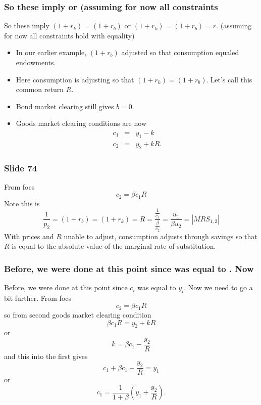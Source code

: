 \documentclass[aspectratio=169]{ltx-talk}
\begin{document}
\begin{frame}
\frametitle{So these imply or (assuming for now all constraints}
So these imply $\left( 1+r_{k}\right) =\left( 1+r_{b}\right) $ or $\left(
1+r_{k}\right) =\left( 1+r_{b}\right) =r.$ (assuming for now all constraints
hold with equality)

\begin{itemize}
\item In our earlier example, $\left( 1+r_{b}\right) $ adjusted so that
consumption equaled endowments.

\item Here consumption is adjusting so that $\left( 1+r_{k}\right) =\left(
1+r_{b}\right) .\ $Let's call this common return $R$.

\item Bond market clearing still gives $b=0.$

\item Goods market clearing conditions are now 
\begin{eqnarray*}
c_{1} &=&y_{1}-k \\
c_{2} &=&y_{2}+kR.
\end{eqnarray*}%
\end{itemize}
\end{frame}

\begin{frame}
\frametitle{Slide 74}
From focs 
\begin{equation*}
c_{2}=\beta c_{1}R
\end{equation*}%
Note this is 
\begin{equation*}
\frac{1}{p_{2}}=\left( 1+r_{b}\right) =\left( 1+r_{k}\right) =R=\frac{\frac{1%
}{c_{1}}}{\frac{\beta }{c_{2}}}=\frac{u_{1}}{\beta u_{2}}=\left\vert
MRS_{1,2}\right\vert
\end{equation*}%
With prices and $R$ unable to adjust, consumption adjusts through savings so
that $R$ is equal to the absolute value of the marginal rate of
substitution.
\end{frame}

\begin{frame}
\frametitle{Before, we were done at this point since was equal to . Now}
Before, we were done at this point since $c_{i}$ was equal to $y_{i}$. Now
we need to go a bit further. From focs 
\begin{equation*}
c_{2}=\beta c_{1}R
\end{equation*}%
so from second goods market clearing condition%
\begin{equation*}
\beta c_{1}R=y_{2}+kR
\end{equation*}%
or 
\begin{equation*}
k=\beta c_{1}-\frac{y_{2}}{R}
\end{equation*}%
and this into the first gives 
\begin{equation*}
c_{1}+\beta c_{1}-\frac{y_{2}}{R}=y_{1}
\end{equation*}%
or 
\begin{equation*}
c_{1}=\frac{1}{1+\beta }\left( y_{1}+\frac{y_{2}}{R}\right) .
\end{equation*}%
\end{frame}
\end{document}
